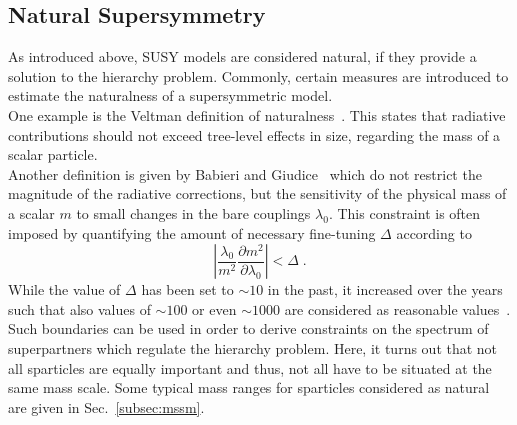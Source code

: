 \subsection{Natural Supersymmetry}
\label{subsec:natural_susy}
As introduced above, SUSY models are considered natural, if they provide a solution to the hierarchy problem. Commonly, certain measures are introduced to estimate the naturalness of a supersymmetric model. \\
One example is the Veltman definition of naturalness~\cite{veltman1981infrared}. This states that radiative contributions should not exceed tree-level effects in size, regarding the mass of a scalar particle. \\
Another definition is given by Babieri and Giudice~\cite{Barbieri198863} which do not restrict the magnitude of the radiative corrections, but the sensitivity of the physical mass of a scalar $m$ to small changes in the bare couplings $\lambda_0$. This constraint is often imposed by quantifying the amount of necessary fine-tuning $\Delta$ according to
\begin{equation}
\left| \frac{\lambda_0}{m^2}\frac{\partial m^2}{\partial \lambda_0} \right| < \Delta \; .
\end{equation}
While the value of $\Delta$ has been set to $\sim10$ in the past, it increased over the years such that also values of $\sim100$ or even $\sim1000$ are considered as reasonable values~\cite{Craig:2013cxa}. Such boundaries can be used in order to derive constraints on the spectrum of superpartners which regulate the hierarchy problem. Here, it turns out that not all sparticles are equally important and thus, not all have to be situated at the same mass scale. Some typical mass ranges for sparticles considered as natural are given in Sec.~\ref{subsec:mssm}. 

